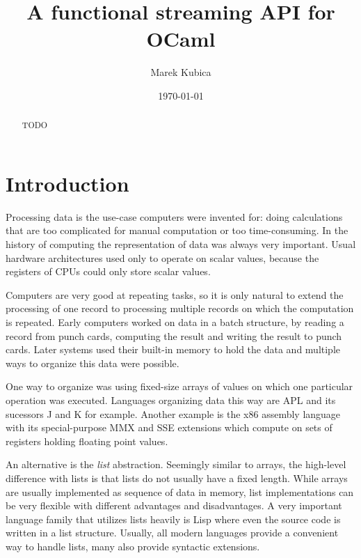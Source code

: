 \documentclass[parskip=half]{scrreprt}
\author{Marek Kubica}
\title{A functional streaming API for OCaml}
\date{\today}
\begin{document}




{}
\begin{abstract}
	\subsubsection*{\abstractname}
	TODO
\end{abstract}

\tableofcontents

\chapter{Introduction}
\label{sec:intro}

Processing data is the use-case computers were invented for: doing calculations
that are too complicated for manual computation or too time-consuming.  In the
history of computing the representation of data was always very important.
Usual hardware architectures used only to operate on scalar values, because the
registers of CPUs could only store scalar values.

Computers are very good at repeating tasks, so it is only natural to extend the
processing of one record to processing multiple records on which the
computation is repeated. Early computers worked on data in a batch structure,
by reading a record from punch cards, computing the result and writing the
result to punch cards. Later systems used their built-in memory to hold the
data and multiple ways to organize this data were possible.

One way to organize was using fixed-size arrays of values on which one
particular operation was executed. Languages organizing data this way are APL
and its sucessors J and K for example. Another example is the x86 assembly
language with its special-purpose MMX and SSE extensions which compute on sets
of registers holding floating point values.

An alternative is the \emph{list} abstraction. Seemingly similar to arrays, the
high-level difference with lists is that lists do not usually have a fixed
length. While arrays are usually implemented as sequence of data in memory,
list implementations can be very flexible with different advantages and
disadvantages. A very important language family that utilizes lists heavily is
Lisp where even the source code is written in a list structure. Usually, all
modern languages provide a convenient way to handle lists, many also provide
syntactic extensions.
\end{document}
